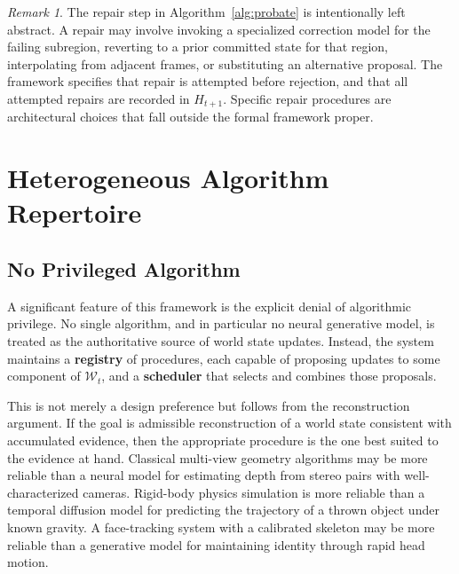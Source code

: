 \documentclass[11pt,a4paper]{article}
\theoremstyle{plain}
\theoremstyle{definition}
\theoremstyle{remark}
\newtheorem{remark}[theorem]{Remark}
\begin{document}
\begin{remark}
The repair step in Algorithm~\ref{alg:probate} is intentionally left abstract. A repair may involve invoking a specialized correction model for the failing subregion, reverting to a prior committed state for that region, interpolating from adjacent frames, or substituting an alternative proposal. The framework specifies that repair is attempted before rejection, and that all attempted repairs are recorded in $H_{t+1}$. Specific repair procedures are architectural choices that fall outside the formal framework proper.
\end{remark}

\section{Heterogeneous Algorithm Repertoire}
\label{sec:repertoire}

\subsection{No Privileged Algorithm}

A significant feature of this framework is the explicit denial of algorithmic privilege. No single algorithm, and in particular no neural generative model, is treated as the authoritative source of world state updates. Instead, the system maintains a \textbf{registry} of procedures, each capable of proposing updates to some component of $\mathcal{W}_t$, and a \textbf{scheduler} that selects and combines those proposals.

This is not merely a design preference but follows from the reconstruction argument. If the goal is admissible reconstruction of a world state consistent with accumulated evidence, then the appropriate procedure is the one best suited to the evidence at hand. Classical multi-view geometry algorithms \cite{hartley2003multiple} may be more reliable than a neural model for estimating depth from stereo pairs with well-characterized cameras. Rigid-body physics simulation is more reliable than a temporal diffusion model for predicting the trajectory of a thrown object under known gravity. A face-tracking system with a calibrated skeleton may be more reliable than a generative model for maintaining identity through rapid head motion.
\end{document}

